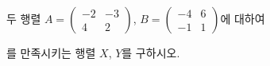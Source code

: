 \hspace*{2mm}\begin{minipage}[t]{\dimexpr\linewidth-2mm\relax}\vspace{0pt}
두 행렬 $A=\begin{pmatrix} -2 & -3 \\ 4 & 2 \end{pmatrix}$, $B=\begin{pmatrix} -4 & 6 \\ -1 & 1 \end{pmatrix}$에 대하여 \par\smallskip{}\par\smallskip\noindent 를 만족시키는 행렬 $X$, $Y$를 구하시오.\end{minipage}
